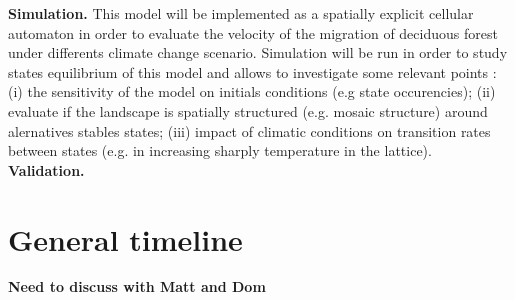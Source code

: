 \textbf{Simulation.} This model will be implemented as a spatially explicit
cellular automaton in order to evaluate the velocity of the
migration of deciduous forest under differents climate change scenario.
Simulation will be run in order to study states equilibrium of this model and
allows to investigate some relevant points : (i) the sensitivity of
the model on initials conditions (e.g state occurencies); (ii) evaluate if the
landscape is spatially structured (e.g. mosaic structure) around alernatives
stables states; (iii) impact of climatic conditions on transition rates
between states (e.g. in increasing sharply temperature in the lattice). \\


\textbf{Validation.} 



\section{General timeline} 

\textbf{Need to discuss with Matt and Dom}

\clearpage



